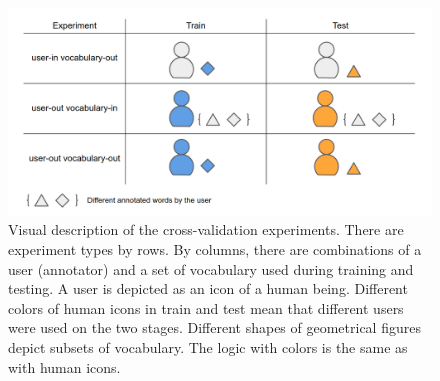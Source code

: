 \begin{figure}[h]
    \centering
    \includegraphics[width=14cm]{Images/Experiments.png}
    \caption{Visual description of the cross-validation experiments. There are experiment types by rows. By columns, there are combinations of a user (annotator) and a set of vocabulary used during training and testing. A user is depicted as an icon of a human being. Different colors of human icons in train and test mean that different users were used on the two stages. Different shapes of geometrical figures depict subsets of vocabulary. The logic with colors is the same as with human icons. }
    \label{fig:experiments-description}
\end{figure} 

